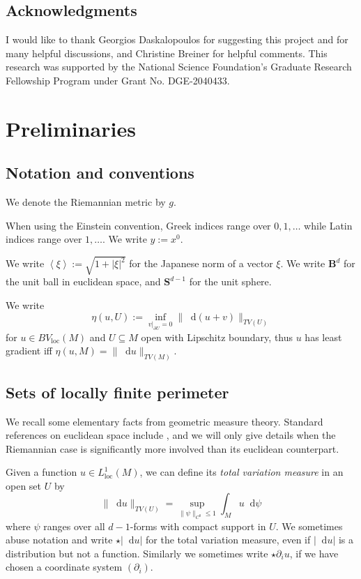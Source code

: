 \documentclass[reqno,11pt]{amsart}
\newcommand{\Sph}{\mathbf S}
\newcommand{\Ball}{\mathbf{B}}
\newcommand*\dif{\mathop{}\!\mathrm{d}}
\newcommand{\dfn}[1]{\emph{#1}\index{#1}}
\newcommand{\loc}{\mathrm{loc}}
\def\Japan#1{\left \langle #1 \right \rangle}
\theoremstyle{definition}
\numberwithin{equation}{section}
\begin{document}
\subsection{Acknowledgments}
I would like to thank Georgios Daskalopoulos for suggesting this project and for many helpful discussions, and Christine Breiner for helpful comments.
This research was supported by the National Science Foundation's Graduate Research Fellowship Program under Grant No. DGE-2040433.

\section{Preliminaries}\label{Prelims}
\subsection{Notation and conventions}
We denote the Riemannian metric by $g$.

When using the Einstein convention, Greek indices range over $0, 1, \dots$ while Latin indices range over $1, \dots$.
We write $y := x^0$.

We write $\Japan \xi := \sqrt{1 + |\xi|^2}$ for the Japanese norm of a vector $\xi$.
We write $\Ball^d$ for the unit ball in euclidean space, and $\Sph^{d - 1}$ for the unit sphere.

We write
$$\eta(u, U) := \inf_{v|_{\partial U} = 0} \|\dif(u + v)\|_{TV(U)}$$
for $u \in BV_\loc(M)$ and $U \subseteq M$ open with Lipschitz boundary, thus $u$ has least gradient iff $\eta(u, M) = \|\dif u\|_{TV(M)}$.

\subsection{Sets of locally finite perimeter}
We recall some elementary facts from geometric measure theory.
Standard references on euclidean space include \cite{simon1983GMT,Giusti77}, and we will only give details when the Riemannian case is significantly more involved than its euclidean counterpart.

Given a function $u \in L^1_\loc(M)$, we can define its \dfn{total variation measure} in an open set $U$ by
$$\|\dif u\|_{TV(U)} = \sup_{\|\psi\|_{C^0} \leq 1} \int_M u \dif \psi$$
where $\psi$ ranges over all $d-1$-forms with compact support in $U$.
We sometimes abuse notation and write $\star |\dif u|$ for the total variation measure, even if $|\dif u|$ is a distribution but not a function.
Similarly we sometimes write $\star \partial_i u$, if we have chosen a coordinate system $(\partial_i)$.
\end{document}
